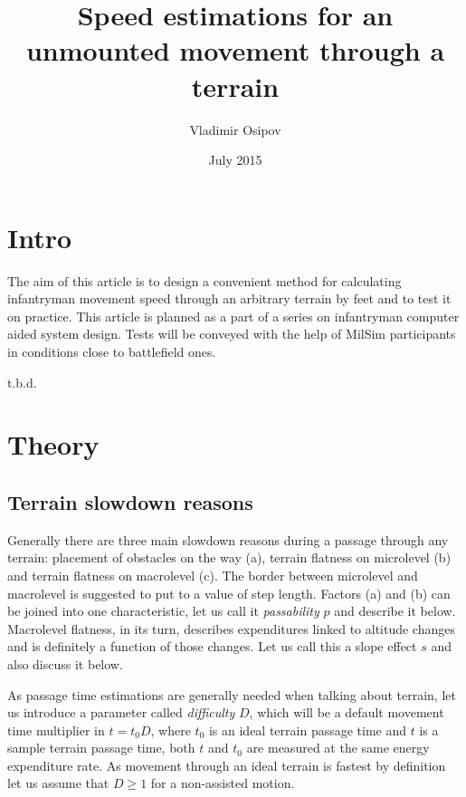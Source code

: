 \documentclass[12pt]{article}
\begin{document}
\title{Speed estimations for an unmounted movement through a terrain}
\author{Vladimir Osipov}
\date{July 2015}
\maketitle

\section{Intro}

The aim of this article is to design a convenient method for calculating infantryman movement speed through an arbitrary terrain by feet and to test it on practice. This article is planned as a part of a series on infantryman computer aided system design. Tests will be conveyed with the help of MilSim participants in conditions close to battlefield ones.

t.b.d.

\newpage

\section{Theory}

\subsection{Terrain slowdown reasons}

Generally there are three main slowdown reasons during a passage through any terrain: placement of obstacles on the way (a), terrain flatness on microlevel (b) and terrain flatness on macrolevel (c). The border between microlevel and macrolevel is suggested to put to a value of step length. Factors (a) and (b) can be joined into one characteristic, let us call it \textit{passability} $p$ and describe it below. Macrolevel flatness, in its turn, describes expenditures linked to altitude changes and is definitely a function of those changes. Let us call this a slope effect $s$ and also discuss it below.

As passage time estimations are generally needed when talking about terrain, let us introduce a parameter called \textit{difficulty} $D$, which will be a default movement time multiplier in $t=t_{0}D$, where $t_{0}$ is an ideal terrain passage time and $t$ is a sample terrain passage time, both $t$ and $t_{0}$ are measured at the same energy expenditure rate. As movement through an ideal terrain is fastest by definition let us assume that $D\geq1$ for a non-assisted motion.
\end{document}
